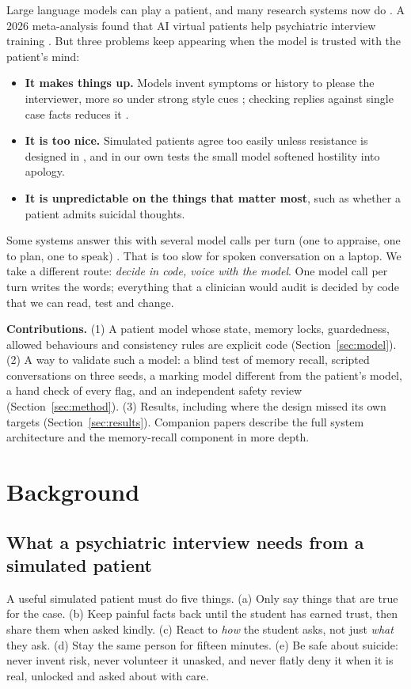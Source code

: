 \documentclass[10pt]{article}
\begin{document}
Large language models can play a patient, and many research systems now do
\citep{chen2023llmempowered,wang2024patient,lee2025psyche,sabour2026patientact,sabour2026patienthub,louie2024roleplaydoh}. A 2026 meta-analysis
found that AI virtual patients help psychiatric interview training \citep{kilincel2026meta}. But three problems keep appearing when the
model is trusted with the patient's mind:
\begin{itemize}
\item \textbf{It makes things up.} Models invent symptoms or history to please the interviewer, more so under strong style cues \citep{chen2023llmempowered}; checking
replies against single case facts reduces it \citep{lai2025patientzero}.
\item \textbf{It is too nice.} Simulated patients agree too easily unless resistance is designed in \citep{steenstra2025scaffolding,lee2025psyche}, and in our
own tests the small model softened hostility into apology.
\item \textbf{It is unpredictable on the things that matter most}, such as whether a patient admits suicidal thoughts.
\end{itemize}

Some systems answer this with several model calls per turn (one to appraise, one to plan, one to speak) \citep{sabour2026patientact}. That is
too slow for spoken conversation on a laptop. We take a different route: \emph{decide in code, voice with the model}. One model call per turn
writes the words; everything that a clinician would audit is decided by code that we can read, test and change.

\textbf{Contributions.} (1) A patient model whose state, memory locks, guardedness, allowed behaviours and consistency rules are explicit code
(Section~\ref{sec:model}). (2) A way to validate such a model: a blind test of memory recall, scripted conversations on three seeds, a
marking model different from the patient's model, a hand check of every flag, and an independent safety review
(Section~\ref{sec:method}). (3) Results, including where the design missed its own targets (Section~\ref{sec:results}). Companion papers
describe the full system architecture and the memory-recall component in more depth.

\section{Background}
\subsection{What a psychiatric interview needs from a simulated patient}
A useful simulated patient must do five things. (a) Only say things that are true for the case. (b) Keep painful facts back until the student has earned trust, then share them when asked kindly. (c) React to \emph{how} the student asks, not just \emph{what} they ask. (d) Stay the same person for fifteen minutes. (e) Be safe about suicide: never invent risk, never volunteer it unasked, and never flatly deny it when it is real, unlocked and asked about with care.
\end{document}
